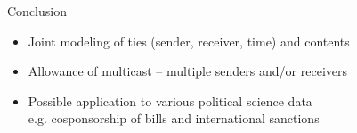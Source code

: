 \documentclass[10pt]{beamer}
\def\bni{\begin{itemize}} \def\ei{\end{itemize}}
\theoremstyle{definition}
\theoremstyle{remark}
\begin{document}
\begin{frame}{Conclusion}
 \bni
 \item Joint modeling of ties (sender, receiver, time) and contents
 	\vspace{0.4cm}
 \item Allowance of multicast -- multiple senders and/or receivers
 	\vspace{0.4cm}
 \item Possible application to various political science data\\ e.g. cosponsorship of bills and international sanctions
 \ei
\end{frame}
\end{document}
